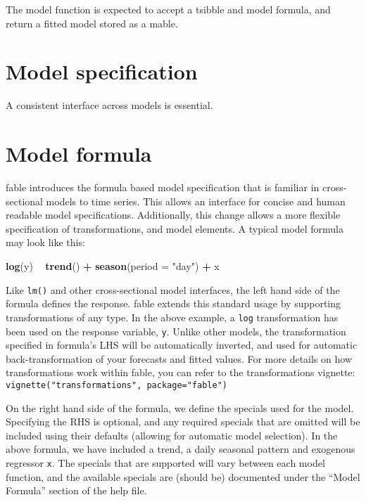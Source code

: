 \documentclass[]{book}
\newenvironment{Shaded}{\begin{snugshade}}{\end{snugshade}}
\newcommand{\DataTypeTok}[1]{\textcolor[rgb]{0.13,0.29,0.53}{#1}}
\newcommand{\KeywordTok}[1]{\textcolor[rgb]{0.13,0.29,0.53}{\textbf{#1}}}
\newcommand{\NormalTok}[1]{#1}
\newcommand{\OperatorTok}[1]{\textcolor[rgb]{0.81,0.36,0.00}{\textbf{#1}}}
\newcommand{\StringTok}[1]{\textcolor[rgb]{0.31,0.60,0.02}{#1}}
\begin{document}
The model function is expected to accept a tsibble and model formula, and return a fitted model stored as a mable.

\hypertarget{interface}{%
\section{Model specification}\label{interface}}

A consistent interface across models is essential.

\hypertarget{model-formula}{%
\section{Model formula}\label{model-formula}}

fable introduces the formula based model specification that is familiar in cross-sectional models to time series. This allows an interface for concise and human readable model specifications. Additionally, this change allows a more flexible specification of transformations, and model elements. A typical model formula may look like this:

\begin{Shaded}
\begin{Highlighting}[]
\KeywordTok{log}\NormalTok{(y) }\OperatorTok{~}\StringTok{ }\KeywordTok{trend}\NormalTok{() }\OperatorTok{+}\StringTok{ }\KeywordTok{season}\NormalTok{(}\DataTypeTok{period =} \StringTok{"day"}\NormalTok{) }\OperatorTok{+}\StringTok{ }\NormalTok{x}
\end{Highlighting}
\end{Shaded}

Like \texttt{lm()} and other cross-sectional model interfaces, the left hand side of the formula defines the response. fable extends this standard usage by supporting transformations of any type. In the above example, a \texttt{log} transformation has been used on the response variable, \texttt{y}. Unlike other models, the transformation specified in formula's LHS will be automatically inverted, and used for automatic back-transformation of your forecasts and fitted values. For more details on how transformations work within fable, you can refer to the transformations vignette: \texttt{vignette("transformations",\ package="fable")}

On the right hand side of the formula, we define the specials used for the model. Specifying the RHS is optional, and any required specials that are omitted will be included using their defaults (allowing for automatic model selection). In the above formula, we have included a trend, a daily seasonal pattern and exogenous regressor \texttt{x}. The specials that are supported will vary between each model function, and the available specials are (should be) documented under the ``Model Formula'' section of the help file.
\end{document}
